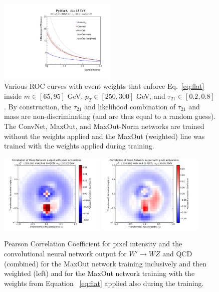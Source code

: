 \begin{figure}[htbp]
  \centering
    \includegraphics[width=0.5\textwidth]{figures/ROCs_window.pdf}
  \caption{Various ROC curves with event weights that enforce Eq.~\ref{eq:flat} inside $m\in[65, 95]$ GeV,  $p_T\in[250, 300]$ GeV, and  $\tau_{21}\in[0.2, 0.8]$.  By construction, the $\tau_{21}$ and likelihood combination of $\tau_{21}$ and mass are non-discriminating (and are thus equal to a random guess).  The ConvNet, MaxOut, and MaxOut-Norm networks are trained without the weights applied and the MaxOut (weighted) line was trained with the weights applied during training.}
  \label{fig:rocCube}
\end{figure}


\begin{figure}[htbp]
  \centering
  \includegraphics[width=0.45\textwidth]{figures/hypercube-pixel-activations-corr.pdf} \includegraphics[width=0.45\textwidth]{figures/ahypercube-pixel-activations-corr.pdf}
  \caption{Pearson Correlation Coefficient for pixel intensity and the convolutional neural network output for $W'\rightarrow WZ$ and QCD (combined) for the MaxOut network training inclusively and then weighted (left) and for the MaxOut network training with the weights from Equation ~\ref{eq:flat} applied also during the training.}
  \label{fig:cor_hyper}
\end{figure}


